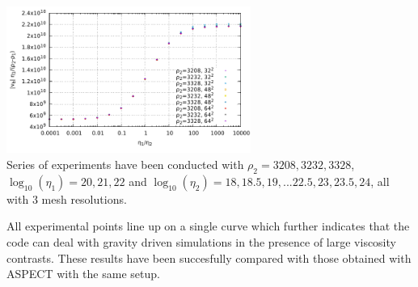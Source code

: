 \begin{center}
\includegraphics[width=8cm]{python_codes/fieldstone_53/images/results.pdf}\\
{\small
Series of experiments have been conducted with $\rho_2=3208,3232,3328$, 
$\log_{10}(\eta_1)=20,21,22$ and $\log_{10}(\eta_2)=18,18.5,19,...22.5,23,23.5,24$, 
all with 3 mesh resolutions.}
 \end{center}

All experimental points line up on a single curve which further
indicates that the code can deal with gravity driven simulations in the presence
of large viscosity contrasts. These results have been succesfully compared with 
those obtained with ASPECT with the same setup.





